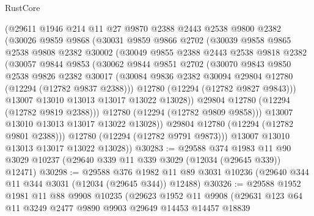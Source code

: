 \begin{lexlean}{RustCore}
\begin{coremodule}
          (@29611
            @1946
            @214
            @11
            @27
            @9870
            @2388
            @2443
            @2538
            @9800
            @2382
            (@30026
              @9859
              @9868
              (@30031
                @9859
                @9866
                @2702
                (@30039
                  @9858
                  @9865
                  @2538
                  @9808
                  @2382
                  @30002
                  (@30049
                    @9855
                    @2388
                    @2443
                    @2538
                    @9818
                    @2382
                    (@30057
                      @9844
                      @9853
                      (@30062
                        @9844
                        @9851
                        @2702
                        (@30070
                          @9843
                          @9850
                          @2538
                          @9826
                          @2382
                          @30017
                          (@30084 @9836 @2382 @30094 @29804 @12780 (@12294 (@12782 @9837 @2388)))
                          @12780
                          (@12294 (@12782 @9827 @9843)))
                        @13007
                        @13010
                        @13013
                        @13017
                        @13022
                        @13028))
                    @29804
                    @12780
                    (@12294 (@12782 @9819 @2388)))
                  @12780
                  (@12294 (@12782 @9809 @9858)))
                @13007
                @13010
                @13013
                @13017
                @13022
                @13028))
            @29804
            @12780
            (@12294 (@12782 @9801 @2388)))
          @12780
          (@12294 (@12782 @9791 @9873)))
        @13007
        @13010
        @13013
        @13017
        @13022
        @13028))
@30283 := @29588
    @374
    @1983
    @11
    @90
    @3029
    @10237
    (@29640 @339 @11 @339 @3029 (@12034 (@29645 @339)) @12471)
@30298 := @29588
    @376
    @1982
    @11
    @89
    @3031
    @10236
    (@29640 @344 @11 @344 @3031 (@12034 (@29645 @344)) @12488)
@30326 := @29588
    @1952
    @1981
    @11
    @88
    @9908
    @10235
    (@29623
      @1952
      @11
      @9908
      (@29631
        @123
        @64
        @11
        @3249
        @2477
        @9890
        @9903
        @29649
        @14453
        @14457
        @18839

\end{coremodule}
\end{lexlean}
